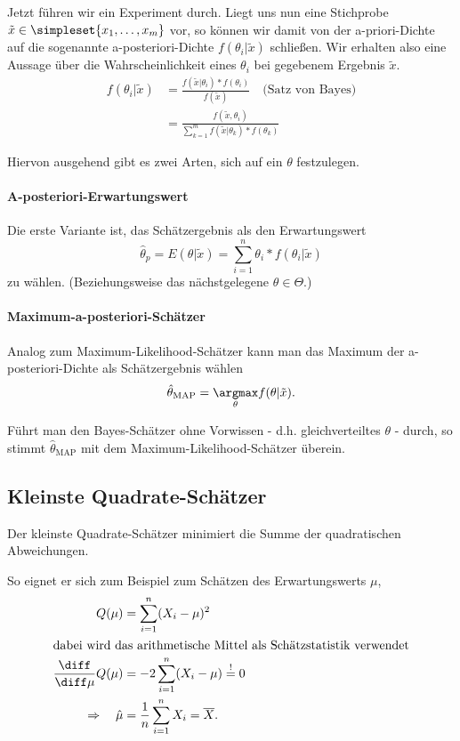 Jetzt führen wir ein Experiment durch. Liegt uns nun eine Stichprobe $\tilde x\in\simpleset{x_1,\ldots,x_m}$ vor, so können wir damit von der a-priori-Dichte auf die sogenannte a-posteriori-Dichte $f(\theta_i|\tilde x)$ schließen.
Wir erhalten also eine Aussage über die Wahrscheinlichkeit eines $\theta_i$ bei gegebenem Ergebnis $\tilde x$.
\begin{align*}
	f(\theta_i|\tilde x)&=\frac{f(\tilde x|\theta_i)*f(\theta_i)}{f(\tilde x)}\quad\text{(Satz von Bayes)}\\
	&=\frac{f(\tilde x,\theta_i)}{\sum_{k=1}^m f(\tilde x|\theta_k) * f(\theta_k)}
\end{align*}

Hiervon ausgehend gibt es zwei Arten, sich auf ein $\theta$ festzulegen.
\paragraph{A-posteriori-Erwartungswert}
Die erste Variante ist, das Schätzergebnis als den Erwartungswert
\begin{equation*}
	\hat\theta_p = E(\theta|\tilde x) = \sum_{i=1}^n \theta_i*f(\theta_i|\tilde x)
\end{equation*}
zu wählen. (Beziehungsweise das nächstgelegene $\theta\in\Theta$.)

\paragraph{Maximum-a-posteriori-Schätzer}
Analog zum Maximum-Likelihood-Schätzer kann man das Maximum der a-posteriori-Dichte als Schätzergebnis wählen
\begin{equation*}
	\hat\theta_{\text{MAP}} = \underset\theta\argmax f(\theta|\tilde x).
\end{equation*}

Führt man den Bayes-Schätzer ohne Vorwissen - d.h. gleichverteiltes $\theta$ - durch, so stimmt $\hat\theta_{\text{MAP}}$ mit dem Maximum-Likelihood-Schätzer überein.



\subsection{Kleinste Quadrate-Schätzer}
Der kleinste Quadrate-Schätzer minimiert die Summe der quadratischen Abweichungen.

So eignet er sich zum Beispiel zum Schätzen des Erwartungswerts $\mu$,
\begin{align*}
	Q(\mu) &= \sum_{i=1}^n(X_i-\mu)^2\\
	\intertext{dabei wird das arithmetische Mittel als Schätzstatistik verwendet}
	\frac{\diff}{\diff \mu} Q(\mu)&= -2\sum_{i=1}^n(X_i-\mu)\overset != 0\\
	\Rightarrow \quad \hat\mu&= \frac1n \sum_{i=1}^n X_i = \overline X.
\end{align*}


